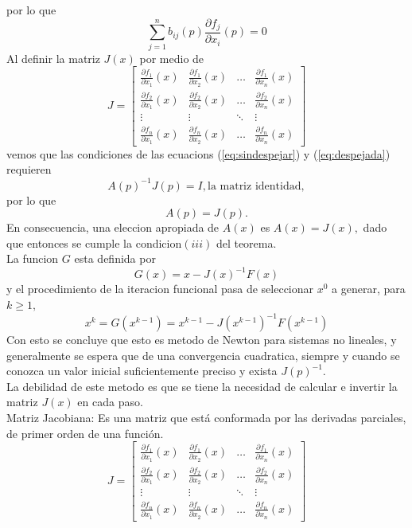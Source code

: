 \documentclass[11pt]{article}
\begin{document}
por lo que 
\begin{equation}
\sum_{j=1}^{n}b_{ij}(p){\frac{\partial f_{j}}{\partial x_{i}}(p)}=0
\label{eq:despejada}
\end{equation}
Al definir la matriz $J(x)$ por medio de
\begin{equation}
J=
\begin{bmatrix}
    \frac{\partial f_1}{\partial x_1}(x)       & \frac{\partial f_1}{\partial x_2}(x)       & \dots & \frac{\partial f_1}{\partial x_n}(x)       \\
    \frac{\partial f_2}{\partial x_1}(x)             & \frac{\partial f_2}{\partial x_2}(x)       & \dots & \frac{\partial f_2}{\partial x_n}(x)       \\
    \vdots & \vdots & \ddots  & \vdots\\
    \frac{\partial f_n}{\partial x_1}(x)             & \frac{\partial f_n}{\partial x_2}(x)       & \dots & \frac{\partial f_n}{\partial x_n}(x)      
    \label{matrix:J}    
\end{bmatrix}
\end{equation}
vemos que las condiciones de las ecuacions (\ref{eq:sindespejar}) y (\ref{eq:despejada}) 
requieren $$A(p)^{-1}J(p)=I, \textrm{la matriz identidad},$$por lo que $$A(p)=J(p).$$
En consecuencia, una eleccion apropiada de $A(x)$ es $A(x)=J(x),$ dado que entonces se cumple la condicion$(iii)$ del teorema.\\
La funcion $G$ esta definida por $$G(x)=x-{J(x)}^{-1}F(x)$$
y el procedimiento de la iteracion funcional pasa de seleccionar $x^0$ a generar, para $k\geq 1,$ $$x^k=G(x^{k-1})=x^{k-1}-{J(x^{k-1})}^{-1}F(x^{k-1})$$
Con esto se concluye que esto es metodo de Newton para sistemas no lineales, y generalmente se espera que de una convergencia cuadratica, siempre y cuando se conozca un valor inicial suficientemente preciso y exista ${J(p)}^{-1}$.\\
La debilidad de este metodo es que se tiene la necesidad de calcular e invertir la matriz $J(x)$ en cada paso.\\
Matriz Jacobiana: Es una matriz que está conformada por las derivadas parciales, de primer orden de una función.
$$
J=
\begin{bmatrix}
    \frac{\partial f_1}{\partial x_1}(x)       & \frac{\partial f_1}{\partial x_2}(x)       & \dots & \frac{\partial f_1}{\partial x_n}(x)       \\
    \frac{\partial f_2}{\partial x_1}(x)             & \frac{\partial f_2}{\partial x_2}(x)       & \dots & \frac{\partial f_2}{\partial x_n}(x)       \\
    \vdots & \vdots & \ddots  & \vdots\\
    \frac{\partial f_n}{\partial x_1}(x)             & \frac{\partial f_n}{\partial x_2}(x)       & \dots & \frac{\partial f_n}{\partial x_n}(x)         
\end{bmatrix}
$$
\end{document}
